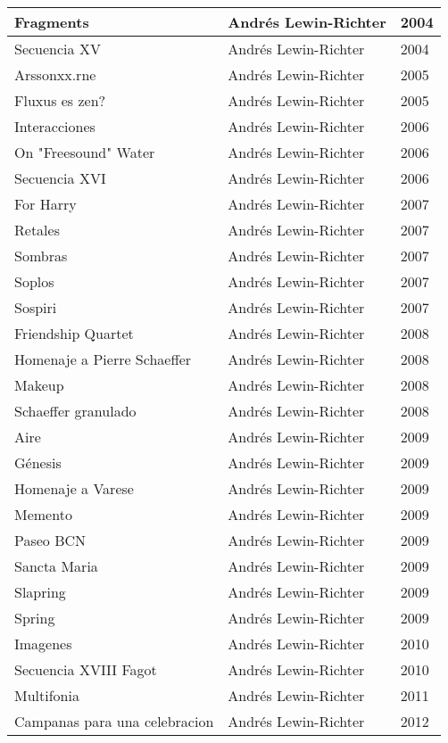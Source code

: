 \begin{center}
\begin{longtable}{| p{} | p{} | p{} |}
Fragments & Andrés Lewin-Richter & 2004 \\ \hline 
Secuencia  XV & Andrés Lewin-Richter & 2004 \\ \hline 
Arssonxx.rne & Andrés Lewin-Richter & 2005 \\ \hline 
Fluxus es zen? & Andrés Lewin-Richter & 2005 \\ \hline 
Interacciones & Andrés Lewin-Richter & 2006 \\ \hline 
On "Freesound" Water & Andrés Lewin-Richter & 2006 \\ \hline 
Secuencia XVI & Andrés Lewin-Richter & 2006 \\ \hline 
For Harry & Andrés Lewin-Richter & 2007 \\ \hline 
Retales & Andrés Lewin-Richter & 2007 \\ \hline 
Sombras & Andrés Lewin-Richter & 2007 \\ \hline 
Soplos & Andrés Lewin-Richter & 2007 \\ \hline 
Sospiri & Andrés Lewin-Richter & 2007 \\ \hline 
Friendship Quartet & Andrés Lewin-Richter & 2008 \\ \hline 
Homenaje a Pierre Schaeffer & Andrés Lewin-Richter & 2008 \\ \hline 
Makeup & Andrés Lewin-Richter & 2008 \\ \hline 
Schaeffer granulado & Andrés Lewin-Richter & 2008 \\ \hline 
Aire & Andrés Lewin-Richter & 2009 \\ \hline 
Génesis & Andrés Lewin-Richter & 2009 \\ \hline 
Homenaje a Varese & Andrés Lewin-Richter & 2009 \\ \hline 
Memento & Andrés Lewin-Richter & 2009 \\ \hline 
Paseo BCN & Andrés Lewin-Richter & 2009 \\ \hline 
Sancta Maria & Andrés Lewin-Richter & 2009 \\ \hline 
Slapring & Andrés Lewin-Richter & 2009 \\ \hline 
Spring & Andrés Lewin-Richter & 2009 \\ \hline 
Imagenes & Andrés Lewin-Richter & 2010 \\ \hline 
Secuencia XVIII Fagot & Andrés Lewin-Richter & 2010 \\ \hline 
Multifonia & Andrés Lewin-Richter & 2011 \\ \hline 
Campanas para una celebracion & Andrés Lewin-Richter & 2012 \\ \hline 

\end{longtable}
\end{center}
